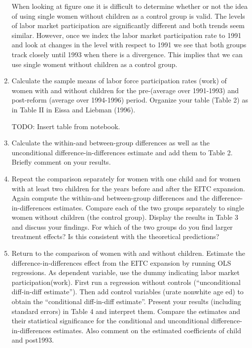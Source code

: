 \documentclass{article}
\begin{document}
\begin{enumerate}[label=\alph*]
When looking at figure one it is difficult to determine whether or not the idea of using single women without children as a control group is valid.  The levels of labor market participation are significantly different and both trends seem similar.  However, once we index the labor market participation rate to 1991 and look at changes in the level with respect to 1991 we see that both groups track closely until 1993 when there is a divergence.  This implies that we can use single woment without children as a control group.

\item Calculate the sample means of labor force participation rates (work) of women with and without children for the pre-(average over 1991-1993) and post-reform (average over 1994-1996) period. Organize your table (Table 2) as in Table II in Eissa and Liebman (1996).

TODO:  Insert table from notebook.

\item Calculate the within-and between-group differences as well as the unconditional difference-in-differences estimate and add them to Table 2. Briefly comment on your results.

\item  Repeat the comparison separately for women with one child and for women with at least two children for the years before and after the EITC expansion. Again compute the within-and between-group differences and the difference-in-differences estimates. Compare each of the two groups separately to single women without children (the control group). Display the results in Table 3 and discuss your findings. For which of the two groups do you find larger treatment effects? Is this consistent with the theoretical predictions?

\item Return to the comparison of women with and without children. Estimate the difference-in-differences effect from the EITC expansion by running OLS regressions. As dependent variable, use the dummy indicating labor market participation(work). First run a regression without controls (“unconditional diff-in-diff estimate”). Then add control variables (urate nonwhite age ed) to obtain the “conditional diff-in-diff estimate”. Present your results (including standard errors) in Table 4 and interpret them. Compare the estimates and their statistical significance for the conditional and unconditional difference-in-differences estimates. Also comment on the estimated coefficients of child and post1993.


\end{enumerate}
\end{document}
